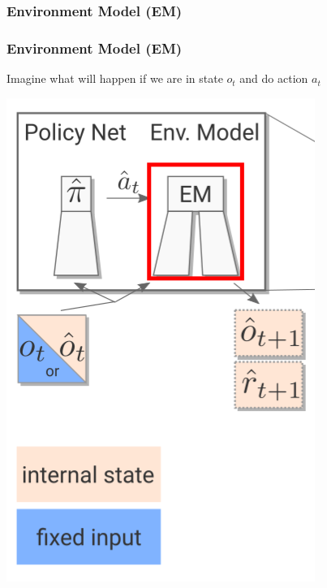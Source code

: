 \PraesentationMasterWeissBlau 
\begin{frame} 
    \frametitle{Environment Model (EM)}
\end{frame}

\PraesentationMasterStandard

\begin{frame}
    \frametitle{Environment Model (EM)}

\begin{multicols}{2}
	\begin{PraesentationAufzaehlung}
		\item Imagine what will happen if we are in state $o_t$ and do action $a_t$
	\end{PraesentationAufzaehlung}
    \vfill\columnbreak
	\begin{center}
    \includegraphics[height=0.5\textheight]{./Images/environment_model.png}%
	\end{center}
\end{multicols}
    
\end{frame}
\clearpage


